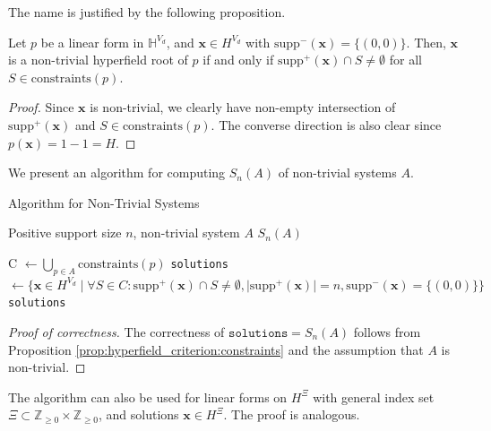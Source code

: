 The name is justified by the following proposition.
\begin{proposition}\label{prop:hyperfield_criterion:constraints}
Let $p$ be a linear form in \( \mathbb{H}^{V_d} \), and $\mathbf{x} \in H^{V_{d}}$ with $\mathrm{supp}^-(\mathbf{x}) = \{ (0,0) \}$. Then, $\mathbf{x}$ is a non-trivial hyperfield root of $p$ if and only if $\mathrm{supp}^+(\mathbf{x}) \cap S \neq \emptyset$ for all $S \in \mathrm{constraints}(p)$. 
\end{proposition}

\begin{proof}
Since $\mathbf{x}$ is non-trivial, we clearly have non-empty intersection of $\mathrm{supp}^+(\mathbf{x})$ and $S \in \mathrm{constraints}(p)$. The converse direction is also clear since $p(\mathbf{x}) = 1 - 1 = H$.
\end{proof}

We present an algorithm for computing $S_{n}(A)$ of non-trivial systems $A$.

\begin{algorithm}
\caption{Algorithm for Non-Trivial Systems}\label{alg:hyperfield_criterion:efficient}
    \begin{algorithmic}[1]
    \Require Positive support size $n$, non-trivial system $A$ 
    \Ensure $S_{n}(A)$

        \State C $\gets \bigcup_{p \in A}\mathrm{constraints}(p)$
        \State \texttt{solutions} $\gets \{ \mathbf{x} \in H^{V_{d}} \mid \forall S \in C: \mathrm{supp}^+(\mathbf{\mathbf{x}}) \cap S \neq \emptyset, \vert \mathrm{supp}^+(\mathbf{x}) \vert = n,  \mathrm{supp}^-(\mathbf{x}) = \{(0,0)\}   \}$
        \State \Return \texttt{solutions}
    \EndFunction
    \end{algorithmic}  
\end{algorithm}


\begin{proof}[Proof of correctness]
The correctness of $\texttt{solutions} = S_{n}(A)$ follows from Proposition \ref{prop:hyperfield_criterion:constraints} and the assumption that $A$ is non-trivial. 
\end{proof}

\begin{remark}\label{rem:fiuhwiu3}
    The algorithm can also be used for linear forms on \( H^{\Xi} \) with general index set \( \Xi \subset \mathbb{Z}_{\geq 0} \times \mathbb{Z}_{\geq 0} \), and solutions \( \mathbf{x} \in H^{\Xi} \). The proof is analogous.
\end{remark}

